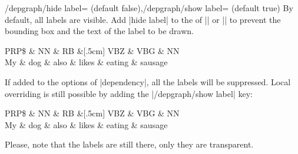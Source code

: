 \documentclass[a4paper]{ltxdoc}
\newcommand{\options}[1][key-value-pairs]{\opt{\oarg{#1}}}
\begin{document}
\begin{keylist}{/depgraph/hide label= (default false),/depgraph/show label= (default true)}
   By default, all labels are visible. Add |hide label| to the \options{} of    |\depedge| or |\groupedge| to prevent the bounding box and the text of the label to be drawn.
\begin{codeexample}[]
\begin{dependency}
   \begin{deptext}[column sep=.5cm, row sep=.1ex]
      PRP\$ \& NN \& RB \&[.5cm] VBZ \& VBG \& NN \\
      My \& dog \& also \& likes \& eating \& sausage \\
   \end{deptext}
\end{dependency}
\end{codeexample}
If added to the options of |dependency|, all the labels will be suppressed. Local overriding is still possible by adding the |/depgraph/show label| key:
\begin{codeexample}[]
\begin{dependency}
   \begin{deptext}[column sep=.5cm, row sep=.1ex]
      PRP\$ \& NN \& RB \&[.5cm] VBZ \& VBG \& NN \\
      My \& dog \& also \& likes \& eating \& sausage \\
   \end{deptext}
\end{dependency}
\end{codeexample}
Please, note that the labels are still there, only they are transparent.
\end{keylist}
\end{document}
